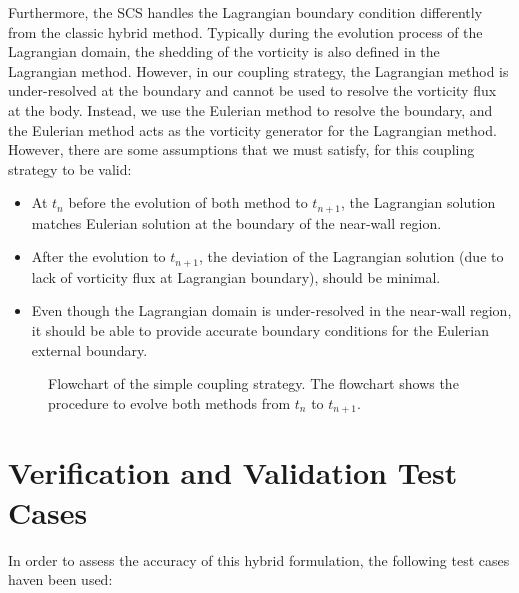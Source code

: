Furthermore, the SCS handles the Lagrangian boundary condition differently from the classic hybrid method. Typically during the evolution process of the Lagrangian domain, the shedding of the vorticity is also defined in the Lagrangian method. However, in our coupling strategy, the Lagrangian method is under-resolved at the boundary and cannot be used to resolve the vorticity flux at the body. Instead, we use the Eulerian method to resolve the boundary, and the Eulerian method acts as the vorticity generator for the Lagrangian method. However, there are some assumptions that we must satisfy, for this coupling strategy to be valid:

	\begin{itemize}
	\item At $t_n$ before the evolution of both method to $t_{n+1}$, the Lagrangian solution matches Eulerian solution at the boundary of the near-wall region.
	\item After the evolution to $t_{n+1}$, the deviation of the Lagrangian solution (due to lack of vorticity flux at Lagrangian boundary), should be minimal.
	\item Even though the Lagrangian domain is under-resolved in the near-wall region, it should be able to provide accurate boundary conditions for the Eulerian external boundary.
	\end{itemize}
	
	\begin{figure}[!t]
		\centering
		\caption{Flowchart of the simple coupling strategy. The flowchart shows the procedure to evolve both methods from $t_n$ to $t_{n+1}$.}
		\label{fig:flowchart_simpleCoupling}
	\end{figure}

\section{Verification and Validation Test Cases}

In order to assess the accuracy of this hybrid formulation, the following test cases haven been used:

